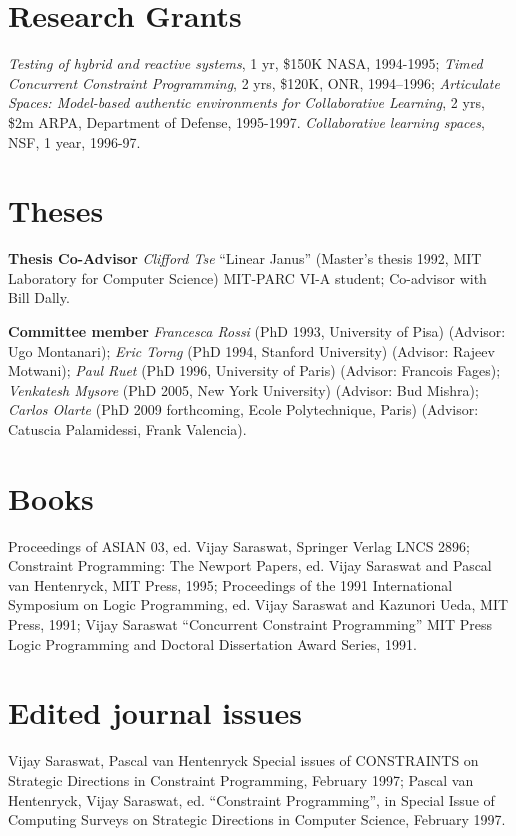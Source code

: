 \documentclass{article}
\begin{document}
\section*{Research Grants}
\textit{Testing of hybrid and reactive systems}, 1 yr, \$150K NASA, 1994-1995; 
\textit{Timed Concurrent Constraint Programming}, 2 yrs, \$120K, ONR, 1994--1996;
\textit{Articulate Spaces:
   Model-based authentic environments for Collaborative Learning}, 2
   yrs, \$2m ARPA, Department of Defense, 1995-1997.
\textit{Collaborative learning spaces}, NSF, 1 year, 1996-97.

\section*{Theses}
{\bf Thesis Co-Advisor}
\textit{Clifford Tse} ``Linear Janus'' (Master's thesis 1992, MIT
  Laboratory for Computer Science) MIT-PARC VI-A student; Co-advisor with Bill Dally.

{\bf Committee member}
\textit{Francesca Rossi} (PhD 1993, University of Pisa) 
(Advisor: Ugo Montanari);
\textit{Eric Torng} (PhD 1994, Stanford University) (Advisor: Rajeev Motwani);
\textit{Paul Ruet} (PhD 1996, University of Paris) (Advisor: Francois Fages);
\textit{Venkatesh Mysore} (PhD 2005, New York University) (Advisor: Bud Mishra);
\textit{Carlos Olarte} (PhD 2009 forthcoming, Ecole Polytechnique, Paris) (Advisor: Catuscia Palamidessi, Frank Valencia).

\section*{Books}
Proceedings of ASIAN 03, ed.{} Vijay Saraswat, Springer Verlag
LNCS 2896;
Constraint Programming: The Newport Papers, ed.{} Vijay
Saraswat and Pascal van Hentenryck, MIT Press, 1995;
Proceedings of the 1991 International Symposium on Logic
  Programming, ed.{} Vijay Saraswat and Kazunori Ueda, MIT Press,
  1991;
Vijay Saraswat ``Concurrent Constraint Programming'' MIT
  Press Logic Programming and Doctoral Dissertation Award Series,
  1991.

\section*{Edited journal issues}
Vijay Saraswat, Pascal van Hentenryck Special issues of
  CONSTRAINTS on Strategic Directions in Constraint Programming,
  February 1997;
Pascal van Hentenryck, Vijay Saraswat, ed. ``Constraint
  Programming'', in Special Issue of Computing Surveys on
  Strategic Directions in Computer Science, February 1997.
\end{document}
